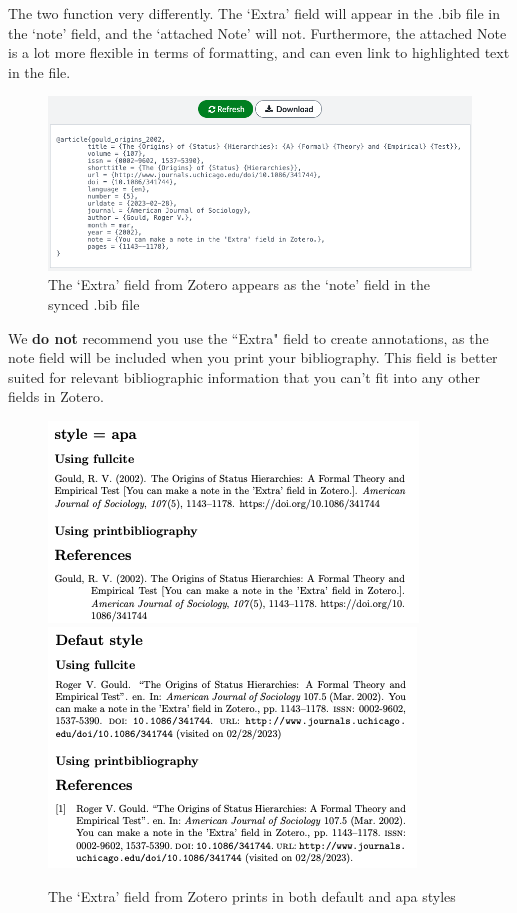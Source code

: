 \documentclass{article}
\begin{document}
The two function very differently. The `Extra' field will appear in the .bib file in the `note' field, and the `attached Note' will not. Furthermore, the attached Note is a lot more flexible in terms of formatting, and can even link to highlighted text in the file.

\begin{figure}[!ht]
\centering
\includegraphics[width=\textwidth]{screenshots/Zotoero2.png}
\caption{The `Extra' field from Zotero appears as the `note' field in the synced .bib file}
\end{figure}



We \textbf{do not} recommend you use the ``Extra" field to create annotations, as the note field will be included when you print your bibliography. This field is better suited for relevant bibliographic information that you can't fit into any other fields in Zotero.

\begin{figure}[!ht]
\centering
\includegraphics{screenshots/Zotero3b.png}
\includegraphics{screenshots/Zotero3c.png}
\caption{The `Extra' field from Zotero prints in both default and apa styles}
\end{figure}
\end{document}
